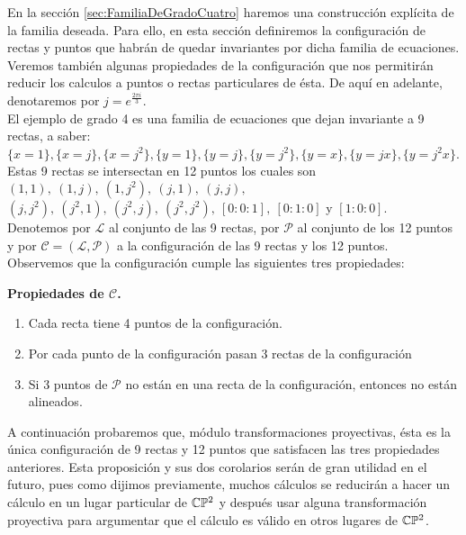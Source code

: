 En la sección \ref{sec:FamiliaDeGradoCuatro} haremos una construcción explícita de la familia deseada. Para ello, en esta sección definiremos la configuración de rectas y puntos que habrán de quedar invariantes por dicha familia de ecuaciones. Veremos también algunas propiedades de la configuración que nos permitirán reducir los calculos a puntos o rectas particulares de ésta. De aquí en adelante, denotaremos por $j=e^{\frac{2\pi i}{3}}$.
\\


El ejemplo de grado 4 es una familia de ecuaciones que dejan invariante a 9 rectas, a saber: $\{x=1\}, \{x=j\}, \{x=j^{2}\}, \{y=1\}, \{y=j\}, \{y=j^{2}\}, \{y=x\}, \{y=jx\}, \{y=j^{2}x\}$.
\\

Estas 9 rectas se intersectan en 12 puntos los cuales son $(1,1),\ (1,j),\ (1,j^{2}),\ (j,1),\ (j,j),$\\ $(j,j^{2}),\ (j^{2},1),\ (j^{2},j),\ (j^{2},j^{2}),\ [0:0:1],\ [0:1:0]$ y $[1:0:0]$.
\\

Denotemos por $\mathcal{L}$ al conjunto de las 9 rectas, por $\mathcal{P}$ al conjunto de los 12 puntos y por $\mathcal{C=(L,P)}$ a la configuración de las 9 rectas y los 12 puntos.
\\

Observemos que la configuración cumple las siguientes tres propiedades:

\textbf{Propiedades de $\mathcal{C}$.}

\begin{enumerate}

\item Cada recta tiene 4 puntos de la configuración.
\item Por cada punto de la configuración pasan 3 rectas de la configuración
\item Si 3 puntos de $\mathcal{P}$ no están en una recta de la configuración, entonces no están alineados.

\end{enumerate} 

A continuación probaremos que, módulo transformaciones proyectivas, ésta es la única configuración de 9 rectas y 12 puntos que satisfacen las tres propiedades anteriores. Esta proposición y sus dos corolarios serán de gran utilidad en el futuro, pues como dijimos previamente, muchos cálculos se reducirán a hacer un cálculo en un lugar particular de $\mathbb{C}\mathbb{P}^2$ y después usar alguna transformación proyectiva para argumentar que el cálculo es válido en otros lugares de $\mathbb{C}\mathbb{P}^2$.
\\

